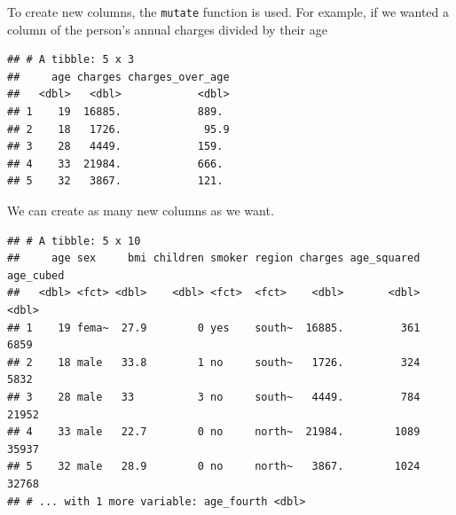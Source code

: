 \documentclass[openany]{book}
\newenvironment{Shaded}{\begin{snugshade}}{\end{snugshade}}
\newcommand{\DataTypeTok}[1]{\textcolor[rgb]{0.13,0.29,0.53}{#1}}
\newcommand{\DecValTok}[1]{\textcolor[rgb]{0.00,0.00,0.81}{#1}}
\newcommand{\KeywordTok}[1]{\textcolor[rgb]{0.13,0.29,0.53}{\textbf{#1}}}
\newcommand{\NormalTok}[1]{#1}
\newcommand{\OperatorTok}[1]{\textcolor[rgb]{0.81,0.36,0.00}{\textbf{#1}}}
\newcommand{\StringTok}[1]{\textcolor[rgb]{0.31,0.60,0.02}{#1}}
\begin{document}
To create new columns, the \texttt{mutate} function is used. For example, if we wanted a column of the person's annual charges divided by their age

\begin{Shaded}
\end{Shaded}

\begin{verbatim}
## # A tibble: 5 x 3
##     age charges charges_over_age
##   <dbl>   <dbl>            <dbl>
## 1    19  16885.            889. 
## 2    18   1726.             95.9
## 3    28   4449.            159. 
## 4    33  21984.            666. 
## 5    32   3867.            121.
\end{verbatim}

We can create as many new columns as we want.

\begin{Shaded}
\end{Shaded}

\begin{verbatim}
## # A tibble: 5 x 10
##     age sex     bmi children smoker region charges age_squared age_cubed
##   <dbl> <fct> <dbl>    <dbl> <fct>  <fct>    <dbl>       <dbl>     <dbl>
## 1    19 fema~  27.9        0 yes    south~  16885.         361      6859
## 2    18 male   33.8        1 no     south~   1726.         324      5832
## 3    28 male   33          3 no     south~   4449.         784     21952
## 4    33 male   22.7        0 no     north~  21984.        1089     35937
## 5    32 male   28.9        0 no     north~   3867.        1024     32768
## # ... with 1 more variable: age_fourth <dbl>
\end{verbatim}
\end{document}
